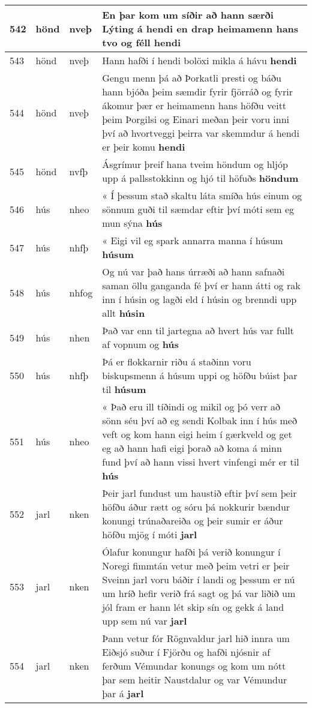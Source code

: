 \documentclass{article}
\begin{document}
\begin{longtable}{p{1cm}|p{1cm}|p{1cm}|p{13cm}}
\hline
542&hönd&nveþ&En þar kom um síðir að hann særði Lýting á hendi en drap heimamenn hans tvo og féll \textbf{hendi} \\
\hline
543&hönd&nveþ&Hann hafði í hendi bolöxi mikla á hávu \textbf{hendi} \\
\hline
544&hönd&nveþ&Gengu menn þá að Þorkatli presti og báðu hann bjóða þeim sæmdir fyrir fjörráð og fyrir ákomur þær er heimamenn hans höfðu veitt þeim Þorgilsi og Einari meðan þeir voru inni því að hvortveggi þeirra var skemmdur á hendi er þeir komu \textbf{hendi} \\
\hline
545&hönd&nvfþ&Ásgrímur þreif hana tveim höndum og hljóp upp á pallsstokkinn og hjó til höfuðs \textbf{höndum} \\
\hline
546&hús&nheo&« Í þessum stað skaltu láta smíða hús einum og sönnum guði til sæmdar eftir því móti sem eg mun sýna \textbf{hús} \\
\hline
547&hús&nhfþ&« Eigi vil eg spark annarra manna í húsum \textbf{húsum} \\
\hline
548&hús&nhfog&Og nú var það hans úrræði að hann safnaði saman öllu ganganda fé því er hann átti og rak inn í húsin og lagði eld í húsin og brenndi upp allt \textbf{húsin} \\
\hline
549&hús&nhen&Það var enn til jartegna að hvert hús var fullt af vopnum og \textbf{hús} \\
\hline
550&hús&nhfþ&Þá er flokkarnir riðu á staðinn voru biskupsmenn á húsum uppi og höfðu búist þar til \textbf{húsum} \\
\hline
551&hús&nheo&« Það eru ill tíðindi og mikil og þó verr að sönn séu því að eg sendi Kolbak inn í hús með veft og kom hann eigi heim í gærkveld og get eg að hann hafi eigi þorað að koma á minn fund því að hann vissi hvert vinfengi mér er til \textbf{hús} \\
\hline
552&jarl&nken&Þeir jarl fundust um haustið eftir því sem þeir höfðu áður rætt og sóru þá nokkurir bændur konungi trúnaðareiða og þeir sumir er áður höfðu mjög í móti \textbf{jarl} \\
\hline
553&jarl&nken&Ólafur konungur hafði þá verið konungur í Noregi fimmtán vetur með þeim vetri er þeir Sveinn jarl voru báðir í landi og þessum er nú um hríð hefir verið frá sagt og þá var liðið um jól fram er hann lét skip sín og gekk á land upp sem nú var \textbf{jarl} \\
\hline
554&jarl&nken&Þann vetur fór Rögnvaldur jarl hið innra um Eiðsjó suður í Fjörðu og hafði njósnir af ferðum Vémundar konungs og kom um nótt þar sem heitir Naustdalur og var Vémundur þar á \textbf{jarl} \\

\end{longtable}
\end{document}

